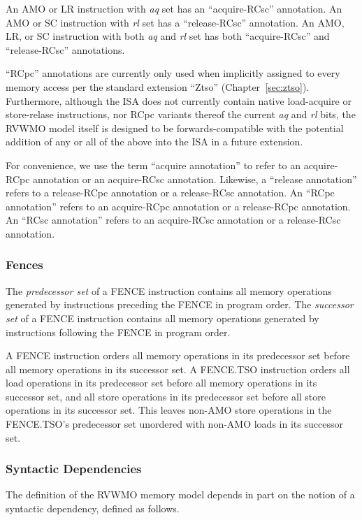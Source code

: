 An AMO or LR instruction with {\em aq} set has an ``acquire-RCsc'' annotation.
An AMO or SC instruction with {\em rl} set has a ``release-RCsc'' annotation.
An AMO, LR, or SC instruction with both {\em aq} and {\em rl} set has both ``acquire-RCsc'' and ``release-RCsc'' annotations.

\begin{commentary}
  ``RCpc'' annotations are currently only used when implicitly assigned to every memory access per the standard extension ``Ztso'' (Chapter~\ref{sec:ztso}).  Furthermore, although the ISA does not currently contain native load-acquire or store-relase instructions, nor RCpc variants thereof the current {\em aq} and {\em rl} bits, the RVWMO model itself is designed to be forwards-compatible with the potential addition of any or all of the above into the ISA in a future extension.
\end{commentary}

For convenience, we use the term ``acquire annotation'' to refer to an acquire-RCpc annotation or an acquire-RCsc annotation.
Likewise, a ``release annotation'' refers to a release-RCpc annotation or a release-RCsc annotation.
An ``RCpc annotation'' refers to an acquire-RCpc annotation or a release-RCpc annotation.
An ``RCsc annotation'' refers to an acquire-RCsc annotation or a release-RCsc annotation.

\subsubsection*{Fences}

The {\em predecessor set} of a FENCE instruction contains all memory operations generated by instructions preceding the FENCE in program order.
The {\em successor set} of a FENCE instruction contains all memory operations generated by instructions following the FENCE in program order.

A FENCE instruction orders all memory operations in its predecessor set before all memory operations in its successor set.
A FENCE.TSO instruction orders all load operations in its predecessor set before all memory operations in its successor set, and all store operations in its predecessor set before all store operations in its successor set.
This leaves non-AMO store operations in the FENCE.TSO's predecessor set unordered with non-AMO loads in its successor set.

\subsubsection*{Syntactic Dependencies}
\label{sec:deps}
The definition of the RVWMO memory model depends in part on the notion of a syntactic dependency, defined as follows.

